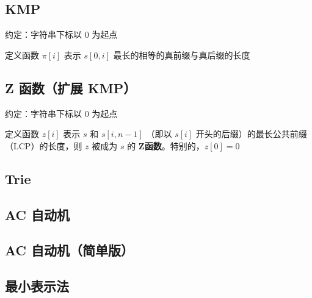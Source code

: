 \documentclass[12pt]{article}
\begin{document}
\newpage

\subsection{KMP}

约定：字符串下标以 $0$ 为起点

定义函数 $\pi[i]$ 表示 $s[0,i]$ 最长的相等的真前缀与真后缀的长度



\subsection{Z 函数（扩展 KMP）}

约定：字符串下标以 $0$ 为起点

定义函数 $z[i]$ 表示 $s$ 和 $s[i,n-1]$ （即以 $s[i]$ 开头的后缀）的最长公共前缀（LCP）的长度，则 $z$ 被成为 $s$ 的 \textbf{Z函数}。特别的，$z[0]=0$



\newpage

\subsection{Trie}



\newpage

\subsection{AC 自动机}



\newpage

\subsection{AC 自动机（简单版）}



\subsection{最小表示法}


\end{document}
